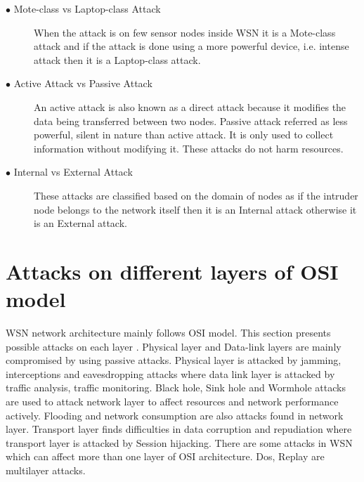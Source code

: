 \begin{description}
  \item[$\bullet$ Mote-class vs Laptop-class Attack]  When the attack is on few sensor nodes inside WSN it is a Mote-class attack and if the attack is done using a more powerful device, i.e. intense attack then it is a Laptop-class attack. 
  \item[$\bullet$ Active Attack vs Passive Attack] An active attack is also known as a direct attack because it modifies the data being transferred between two nodes. Passive attack referred as less powerful, silent in nature than active attack. It is only used to collect information without modifying it. These attacks do not harm resources.
  \item[$\bullet$ Internal vs External Attack] These attacks are classified based on the domain of nodes as if the intruder node belongs to the network itself then it is an Internal attack otherwise it is an External attack.
\end{description}

\noindent
\section{Attacks on different layers of OSI model}
WSN network architecture mainly follows OSI model. This section presents possible attacks on each layer \cite{lupu2009main}. Physical layer and Data-link layers are mainly compromised by using passive attacks. Physical layer is attacked by jamming, interceptions and eavesdropping attacks where data link layer is attacked by traffic analysis, traffic monitoring. Black hole, Sink hole and Wormhole attacks are used to attack network layer to affect resources and network performance actively. Flooding and network consumption are also attacks found in network layer. Transport layer finds difficulties in data corruption and repudiation where transport layer is attacked by Session hijacking. There are some attacks in WSN which can affect more than one layer of OSI architecture. Dos, Replay are multilayer attacks.

